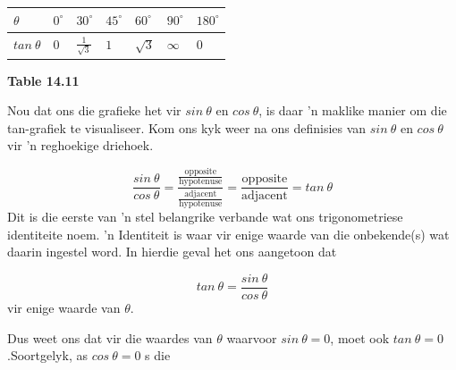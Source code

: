 \begin{table}[H]
\begin{center}
\label{m39414*id89593}
\noindent

\begin{tabular}[t]{|l|l|l|l|l|l|l|}\hline
$\theta $&
${0}^{\circ }$&
${30}^{\circ }$&
${45}^{\circ }$&
${60}^{\circ }$&
${90}^{\circ }$&
${180}^{\circ }$
\\ \hline
$tan~\theta $&
$0$ &
$\frac{1}{\sqrt{3}}$&
$1$ &
$\sqrt{3}$&
$\infty $&
$0$%
\\ \hline
\end{tabular}
\end{center}
\begin{center}{\small\bfseries Table 14.11}\end{center}
\end{table}
\par
Nou dat ons die grafieke het vir $sin~\theta $ en $cos~\theta $, is daar ’n maklike manier om die tan-grafiek te visualiseer. Kom ons
kyk weer na ons definisies van $sin~\theta $ en $cos~\theta $ vir ’n reghoekige driehoek.\par 
\nopagebreak\noindent{}
\begin{equation*}
\frac{sin~\theta }{cos~\theta }=\frac{\frac{\mbox{opposite}}{\mbox{hypotenuse}}}{\frac{\mbox{adjacent}}{\mbox{hypotenuse}}}=\frac{\mbox{opposite}}{\mbox{adjacent}}=tan~\theta 
\end{equation*}
Dit is die eerste van ’n stel belangrike verbande wat ons trigonometriese identiteite noem. ’n Identiteit is waar vir
enige waarde van die onbekende(s) wat daarin ingestel word. In hierdie geval het ons aangetoon dat\par 
\nopagebreak\noindent{}
\begin{equation*}
tan~\theta =\frac{sin~\theta }{cos~\theta }
\end{equation*}
vir enige waarde van $\theta $.\par 
Dus weet ons dat vir die waardes van $\theta $  waarvoor $sin~\theta =0$, moet ook  $tan~\theta =0$.Soortgelyk, as $cos~\theta =0$ s die
